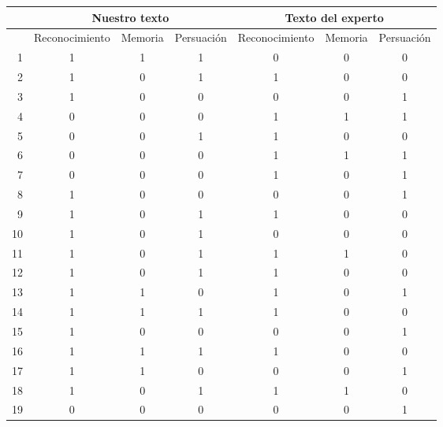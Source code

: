 \begin{table}
\centering
\tiny
\begin{tabular}{|r|c|c|c|c|c|c|}
   & \multicolumn{3}{c|}{Nuestro texto}     & \multicolumn{3}{c|}{Texto del experto}   \\\hline
   & Reconocimiento & Memoria & Persuación & Reconocimiento & Memoria & Persuación \\\hline \hline

1 &         1 &         1 &         1 &         0 &         0 &         0 \\
2 &         1 &         0 &         1 &         1 &         0 &         0 \\
3 &         1 &         0 &         0 &         0 &         0 &         1 \\
4 &         0 &         0 &         0 &         1 &         1 &         1 \\
5 &         0 &         0 &         1 &         1 &         0 &         0 \\
6 &         0 &         0 &         0 &         1 &         1 &         1 \\
7 &         0 &         0 &         0 &         1 &         0 &         1 \\
8 &         1 &         0 &         0 &         0 &         0 &         1 \\
9 &         1 &         0 &         1 &         1 &         0 &         0 \\
10 &         1 &         0 &         1 &         0 &         0 &         0 \\
11 &         1 &         0 &         1 &         1 &         1 &         0 \\
12 &         1 &         0 &         1 &         1 &         0 &         0 \\
13 &         1 &         1 &         0 &         1 &         0 &         1 \\
14 &         1 &         1 &         1 &         1 &         0 &         0 \\
15 &         1 &         0 &         0 &         0 &         0 &         1 \\
16 &         1 &         1 &         1 &         1 &         0 &         0 \\
17 &         1 &         1 &         0 &         0 &         0 &         1 \\
18 &         1 &         0 &         1 &         1 &         1 &         0 \\
19 &         0 &         0 &         0 &         0 &         0 &         1 \\

\end{tabular}
\end{table}
